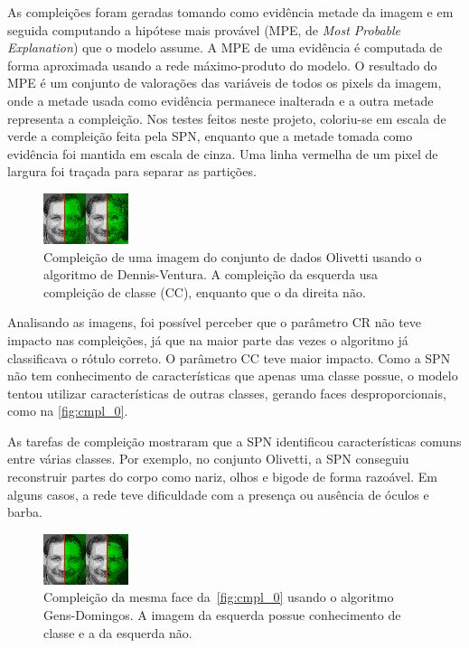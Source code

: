 \documentclass[12pt]{article}
\theoremstyle{plain}
\numberwithin{equation}{section}
\begin{document}
As compleições foram geradas tomando como evidência metade da imagem e em seguida computando a
hipótese mais provável (MPE, de \textit{Most Probable Explanation}) que o modelo assume. A MPE de
uma evidência é computada de forma aproximada usando a rede máximo-produto do modelo. O resultado
do MPE é um conjunto de valorações das variáveis de todos os pixels da imagem, onde a metade usada
como evidência permanece inalterada e a outra metade representa a compleição. Nos testes feitos
neste projeto, coloriu-se em escala de verde a compleição feita pela SPN, enquanto que a metade
tomada como evidência foi mantida em escala de cinza. Uma linha vermelha de um pixel de largura foi
traçada para separar as partições.

\begin{figure}[h]
  \centering\includegraphics[scale=5.0]{cmpl/dennis/face_0.png}
  \caption{Compleição de uma imagem do conjunto de dados Olivetti usando o algoritmo de
    Dennis-Ventura. A compleição da esquerda usa compleição de classe (CC), enquanto que o da
    direita não.\label{fig:cmpl_0}}
\end{figure}

Analisando as imagens, foi possível perceber que o parâmetro CR não teve impacto nas compleições,
já que na maior parte das vezes o algoritmo já classificava o rótulo correto. O parâmetro CC teve
maior impacto. Como a SPN não tem conhecimento de características que apenas uma classe possue, o
modelo tentou utilizar características de outras classes, gerando faces desproporcionais, como na
\autoref{fig:cmpl_0}.

As tarefas de compleição mostraram que a SPN identificou características comuns entre várias
classes. Por exemplo, no conjunto Olivetti, a SPN conseguiu reconstruir partes do corpo como nariz,
olhos e bigode de forma razoável. Em alguns casos, a rede teve dificuldade com a presença ou
ausência de óculos e barba.

\begin{figure}[h]
  \centering\includegraphics[scale=21.0]{cmpl/gens/face_0.png}
  \caption{Compleição da mesma face da~\autoref{fig:cmpl_0} usando o algoritmo Gens-Domingos. A
    imagem da esquerda possue conhecimento de classe e a da esquerda não.}
\end{figure}
\end{document}
